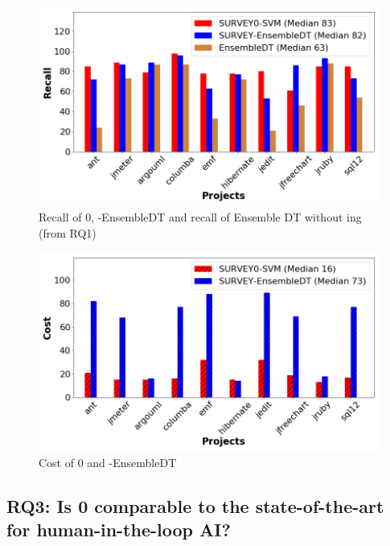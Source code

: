 \documentclass[10pt,conference]{IEEEtran}
\begin{document}
\begin{figure}[!t]
\begin{center}
\includegraphics[width=\linewidth]{rq2_survey0_recall.png}
\caption{Recall of {\IT}0, {\IT}-EnsembleDT and recall of Ensemble DT without {\IT}ing (from RQ1)}
\label{fig rq2 survey recall}
\end{center}
\end{figure}



\begin{figure}[!t]
\begin{center}
\includegraphics[width=\linewidth]{rq2_survey0_cost.png}
\caption{Cost of {\IT}0 and {\IT}-EnsembleDT}
\label{fig rq2 survey cost}
\end{center}
\end{figure}


\subsection{RQ3: Is  {\IT}0 comparable to the state-of-the-art for human-in-the-loop AI?}
\end{document}
